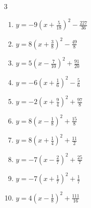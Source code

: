 \begin{multicols}{3}
\begin{enumerate}
  \item $\displaystyle y=-9\left( x+\frac{5}{18}\right)^{2}-\frac{227}{36}$


  \item $\displaystyle y=8\left( x+\frac{3}{8}\right)^{2}-\frac{49}{8}$


  \item $\displaystyle y=5\left( x-\frac{7}{10}\right)^{2}+\frac{91}{20}$


  \item $\displaystyle y=-6\left( x+\frac{1}{6}\right)^{2}-\frac{5}{6}$


  \item $\displaystyle y=-2\left( x+\frac{9}{4}\right)^{2}+\frac{97}{8}$


  \item $\displaystyle y=8\left( x-\frac{1}{8}\right)^{2}+\frac{15}{8}$


  \item $\displaystyle y=8\left( x+\frac{1}{4}\right)^{2}+\frac{11}{2}$


  \item $\displaystyle y=-7\left( x-\frac{2}{7}\right)^{2}+\frac{25}{7}$


  \item $\displaystyle y=-7\left( x+\frac{1}{7}\right)^{2}+\frac{1}{7}$


  \item $\displaystyle y=4\left( x-\frac{1}{8}\right)^{2}+\frac{111}{16}$


\end{enumerate}
\end{multicols}
